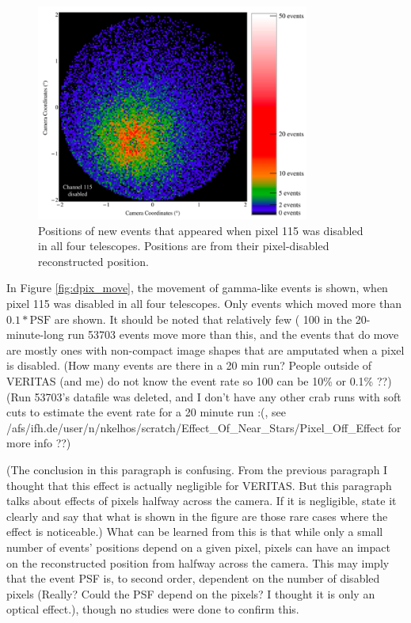     \begin{figure}[ht]
      \centering
      \includegraphics[width=0.8\textwidth]{images/disabled_pixel/appearing_events}
      \caption[Newly Appearing Events]{
        Positions of new events that appeared when pixel 115 was disabled in all four telescopes.
        Positions are from their pixel-disabled reconstructed position.
      }
      \label{fig:dpix_appear}
    \end{figure}

    In Figure \ref{fig:dpix_move}, the movement of gamma-like events is shown, when pixel 115 was disabled in all four telescopes.
    Only events which moved more than $0.1*\text{PSF}$ are shown.
    It should be noted that relatively few ( {\color{red}\nicetilde{}100 in the 20-minute-long run 53703 events} move more than this, and the events that do move are mostly ones with non-compact image shapes that are amputated when a pixel is disabled.
    {\color{red}(How many events are there in a 20 min run? People outside of VERITAS (and me) do not know the event rate so 100 can be 10\% or 0.1\% ??)}
    {\color{red}(Run 53703's datafile was deleted, and I don't have any other crab runs with soft cuts to estimate the event rate for a 20 minute run :(, see /afs/ifh.de/user/n/nkelhos/scratch/Effect\_Of\_Near\_Stars/Pixel\_Off\_Effect for more info ??)}

    {\color{red}(The conclusion in this paragraph is confusing. From the previous paragraph I thought that this effect is actually negligible for VERITAS. But this paragraph talks about effects of pixels halfway across the camera. If it is negligible, state it clearly and say that what is shown in the figure are those rare cases where the effect is noticeable.)}
    What can be learned from this is that while only a small number of events' positions depend on a given pixel, pixels can have an impact on the reconstructed position from halfway across the camera.
    This may imply that the event PSF is, to second order, dependent on the number of disabled pixels {\color{red}(Really? Could the PSF depend on the pixels? I thought it is only an optical effect.)}, though no studies were done to confirm this.


